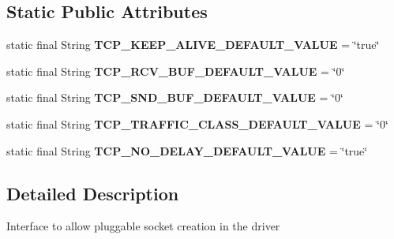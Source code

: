 \subsection*{Static Public Attributes}
\begin{DoxyCompactItemize}
\item 
\mbox{\label{interfacecom_1_1mysql_1_1cj_1_1protocol_1_1_socket_factory_a1875d288dd7f0366b75714541dae162d}} 
static final String {\bfseries T\+C\+P\+\_\+\+K\+E\+E\+P\+\_\+\+A\+L\+I\+V\+E\+\_\+\+D\+E\+F\+A\+U\+L\+T\+\_\+\+V\+A\+L\+UE} = \char`\"{}true\char`\"{}
\item 
\mbox{\label{interfacecom_1_1mysql_1_1cj_1_1protocol_1_1_socket_factory_a676028cc91743d24b85ff9feba56ebf0}} 
static final String {\bfseries T\+C\+P\+\_\+\+R\+C\+V\+\_\+\+B\+U\+F\+\_\+\+D\+E\+F\+A\+U\+L\+T\+\_\+\+V\+A\+L\+UE} = \char`\"{}0\char`\"{}
\item 
\mbox{\label{interfacecom_1_1mysql_1_1cj_1_1protocol_1_1_socket_factory_a1e431d84057266c2ce6dd98017457b45}} 
static final String {\bfseries T\+C\+P\+\_\+\+S\+N\+D\+\_\+\+B\+U\+F\+\_\+\+D\+E\+F\+A\+U\+L\+T\+\_\+\+V\+A\+L\+UE} = \char`\"{}0\char`\"{}
\item 
\mbox{\label{interfacecom_1_1mysql_1_1cj_1_1protocol_1_1_socket_factory_abc8024d17cc453d316ba98ccccd75975}} 
static final String {\bfseries T\+C\+P\+\_\+\+T\+R\+A\+F\+F\+I\+C\+\_\+\+C\+L\+A\+S\+S\+\_\+\+D\+E\+F\+A\+U\+L\+T\+\_\+\+V\+A\+L\+UE} = \char`\"{}0\char`\"{}
\item 
\mbox{\label{interfacecom_1_1mysql_1_1cj_1_1protocol_1_1_socket_factory_ade8cf2685f0f0388368799db4b8c7167}} 
static final String {\bfseries T\+C\+P\+\_\+\+N\+O\+\_\+\+D\+E\+L\+A\+Y\+\_\+\+D\+E\+F\+A\+U\+L\+T\+\_\+\+V\+A\+L\+UE} = \char`\"{}true\char`\"{}
\end{DoxyCompactItemize}


\subsection{Detailed Description}
Interface to allow pluggable socket creation in the driver 

